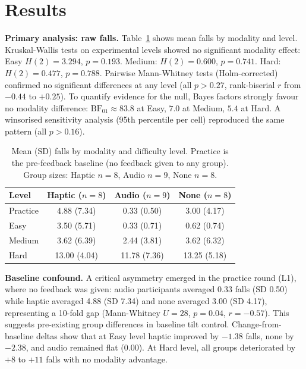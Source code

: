 \documentclass[sigconf]{acmart}
\begin{document}
\section{Results}

\textbf{Primary analysis: raw falls.}
Table~\ref{tab:descriptives} shows mean falls by modality and level.
Kruskal-Wallis tests on experimental levels showed no significant modality effect: Easy $H(2)=3.294$, $p=0.193$. Medium: $H(2)=0.600$, $p=0.741$. Hard: $H(2)=0.477$, $p=0.788$.
Pairwise Mann-Whitney tests (Holm-corrected) confirmed no significant differences at any level (all $p > 0.27$, rank-biserial $r$ from $-0.44$ to $+0.25$).
To quantify evidence for the null, Bayes factors strongly favour no modality difference: $\text{BF}_{01} \approx 83.8$ at Easy, $7.0$ at Medium, $5.4$ at Hard.
A winsorised sensitivity analysis (95th percentile per cell) reproduced the same pattern (all $p > 0.16$).

\begin{table}[h]
  \centering
  \caption{Mean (SD) falls by modality and difficulty level. Practice is the pre-feedback baseline (no feedback given to any group). Group sizes: Haptic $n=8$, Audio $n=9$, None $n=8$.}
  \label{tab:descriptives}
  \begin{tabular}{lccc}
    \toprule
    \textbf{Level} & \textbf{Haptic ($n=8$)} & \textbf{Audio ($n=9$)} & \textbf{None ($n=8$)} \\
    \midrule
    Practice & 4.88 (7.34) & 0.33 (0.50) & 3.00 (4.17) \\
    Easy     & 3.50 (5.71) & 0.33 (0.71) & 0.62 (0.74) \\
    Medium   & 3.62 (6.39) & 2.44 (3.81) & 3.62 (6.32) \\
    Hard     & 13.00 (4.04) & 11.78 (7.36) & 13.25 (5.18) \\
    \bottomrule
  \end{tabular}
\end{table}

\textbf{Baseline confound.}
A critical asymmetry emerged in the practice round (L1), where no feedback was given: audio participants averaged 0.33 falls (SD 0.50) while haptic averaged 4.88 (SD 7.34) and none averaged 3.00 (SD 4.17), representing a 10-fold gap (Mann-Whitney $U=28$, $p=0.04$, $r=-0.57$).
This suggests pre-existing group differences in baseline tilt control.
Change-from-baseline deltas show that at Easy level haptic improved by $-1.38$ falls, none by $-2.38$, and audio remained flat ($0.00$). At Hard level, all groups deteriorated by $+8$ to $+11$ falls with no modality advantage.
\end{document}
